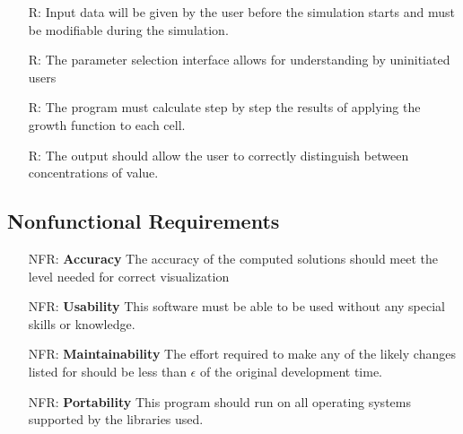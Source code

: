\documentclass[12pt]{article}
\newcounter{reqnum} %
\newcounter{nfrnum} %
\begin{document}
\noindent \begin{itemize}

\item[R\refstepcounter{reqnum}\thereqnum \label{R_Inputs}:] Input data will be given by the user before the simulation starts and 
must be modifiable during the simulation.

\item[R\refstepcounter{reqnum}\thereqnum \label{R_Selection}:] The parameter selection interface allows for understanding by uninitiated users

\item[R\refstepcounter{reqnum}\thereqnum \label{R_Calculate}:] The program must calculate step by step the results of applying the growth function to each cell.

\item[R\refstepcounter{reqnum}\thereqnum \label{R_Output}:] The output should allow the user to correctly distinguish between concentrations of value.

\end{itemize}

\subsection{Nonfunctional Requirements}

\noindent \begin{itemize}

\item[NFR\refstepcounter{nfrnum}\thenfrnum \label{NFR_Accuracy}:]
  \textbf{Accuracy} The accuracy of the computed solutions should meet the level needed for correct visualization

\item[NFR\refstepcounter{nfrnum}\thenfrnum \label{NFR_Usability}:] \textbf{Usability} This software must be able to be used without any special skills or knowledge.

\item[NFR\refstepcounter{nfrnum}\thenfrnum \label{NFR_Maintainability}:]
  \textbf{Maintainability} The effort required to make any of the likely
    changes listed for \progname{} should be less than $\epsilon$ of the original
    development time.

\item[NFR\refstepcounter{nfrnum}\thenfrnum \label{NFR_Portability}:]
  \textbf{Portability} This program should run on all operating systems supported by the libraries used.

\end{itemize}
\end{document}

